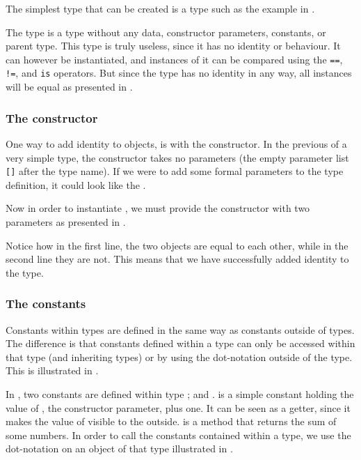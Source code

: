The simplest type that can be created is a type such as the example in
.


The type  is a type without any data, constructor parameters, constants,
or parent type. This type is truly useless, since it has no identity or
behaviour. It can however be instantiated, and instances of it can be compared
using the \texttt{==}, \texttt{!=}, and \texttt{is} operators. But since the
type has no identity in any way, all instances will be equal as presented in
.


\subsubsection{The constructor}

One way to add identity to objects, is with the constructor. In the previous
 of a very simple type, the constructor takes no parameters (the empty
parameter list \texttt{[]} after the type name). If we were to add some formal
parameters to the type definition, it could look like the
.


Now in order to instantiate , we must provide the constructor with two
parameters as presented in . 


Notice how in the first line, the two objects are equal to each other, while in
the second line they are not. This means that we have successfully added
identity to the  type.

\subsubsection{The constants}

Constants within types are defined in the same way as constants outside of
types. The difference is that constants defined within a type can only be
accessed within that type (and inheriting types) or by using the dot-notation
outside of the type. This is illustrated in .


In , two constants are defined within type ;
 and .  is a simple
constant holding the value of , the constructor parameter, plus one.
It can be seen as a getter, since it makes the value of  visible to
the outside.  is a method that returns the sum of some
numbers. In order to call the constants contained within a type, we use the dot-notation 
on an object of that type illustrated in .

